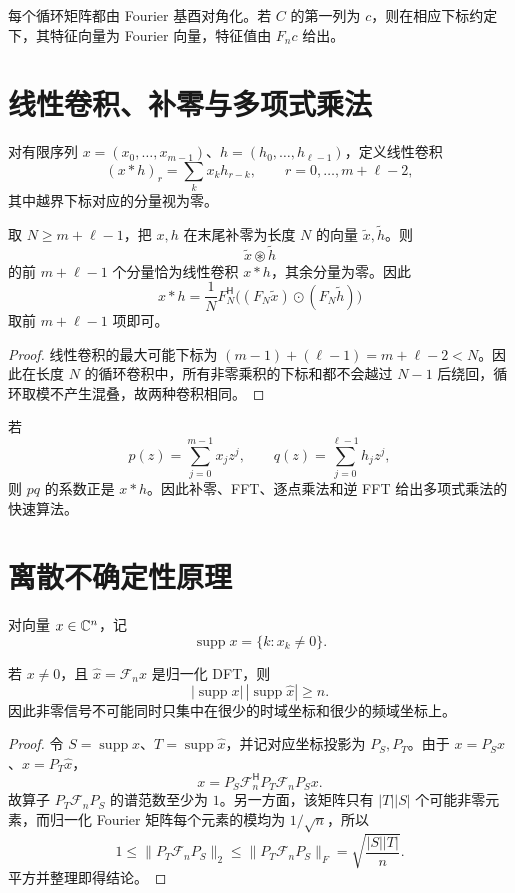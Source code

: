 \begin{corollary}
每个循环矩阵都由 Fourier 基酉对角化。若 $C$ 的第一列为 $c$，则在相应下标约定下，其特征向量为 Fourier 向量，特征值由 $F_nc$ 给出。
\end{corollary}

\section{线性卷积、补零与多项式乘法}

对有限序列 $x=(x_0,\ldots,x_{m-1})$、$h=(h_0,\ldots,h_{\ell-1})$，定义线性卷积
\[
(x*h)_r=\sum_kx_kh_{r-k},
\qquad r=0,\ldots,m+\ell-2,
\]
其中越界下标对应的分量视为零。

\begin{theorem}[补零把线性卷积化为循环卷积]
取 $N\ge m+\ell-1$，把 $x,h$ 在末尾补零为长度 $N$ 的向量
$\widetilde x,\widetilde h$。则
\[
\widetilde x\mathbin{\circledast}\widetilde h
\]
的前 $m+\ell-1$ 个分量恰为线性卷积 $x*h$，其余分量为零。因此
\[
x*h=\frac1N F_N^{\mathsf H}
\bigl((F_N\widetilde x)\odot(F_N\widetilde h)\bigr)
\]
取前 $m+\ell-1$ 项即可。
\end{theorem}
\begin{proof}
线性卷积的最大可能下标为 $(m-1)+(\ell-1)=m+\ell-2<N$。因此在长度 $N$ 的循环卷积中，所有非零乘积的下标和都不会越过 $N-1$ 后绕回，循环取模不产生混叠，故两种卷积相同。
\end{proof}

若
\[
p(z)=\sum_{j=0}^{m-1}x_jz^j,
\qquad
q(z)=\sum_{j=0}^{\ell-1}h_jz^j,
\]
则 $pq$ 的系数正是 $x*h$。因此补零、FFT、逐点乘法和逆 FFT 给出多项式乘法的快速算法。

\section{离散不确定性原理}

对向量 $x\in\mathbb{C}^n$，记
\[
\operatorname{supp}x=\{k:x_k\ne0\}.
\]

\begin{theorem}
若 $x\ne0$，且 $\widehat x=\mathcal F_nx$ 是归一化 DFT，则
\[
|\operatorname{supp}x|\,
|\operatorname{supp}\widehat x|\ge n.
\]
因此非零信号不可能同时只集中在很少的时域坐标和很少的频域坐标上。
\end{theorem}
\begin{proof}
令 $S=\operatorname{supp}x$、$T=\operatorname{supp}\widehat x$，并记对应坐标投影为 $P_S,P_T$。由于
$x=P_Sx$、$\widehat x=P_T\widehat x$，
\[
x=P_S\mathcal F_n^{\mathsf H}P_T\mathcal F_nP_Sx.
\]
故算子
$P_T\mathcal F_nP_S$ 的谱范数至少为 $1$。另一方面，该矩阵只有
$|T||S|$ 个可能非零元素，而归一化 Fourier 矩阵每个元素的模均为
$1/\sqrt n$，所以
\[
1\le\lVert P_T\mathcal F_nP_S\rVert_2
\le\lVert P_T\mathcal F_nP_S\rVert_F
=\sqrt{\frac{|S||T|}{n}}.
\]
平方并整理即得结论。
\end{proof}

